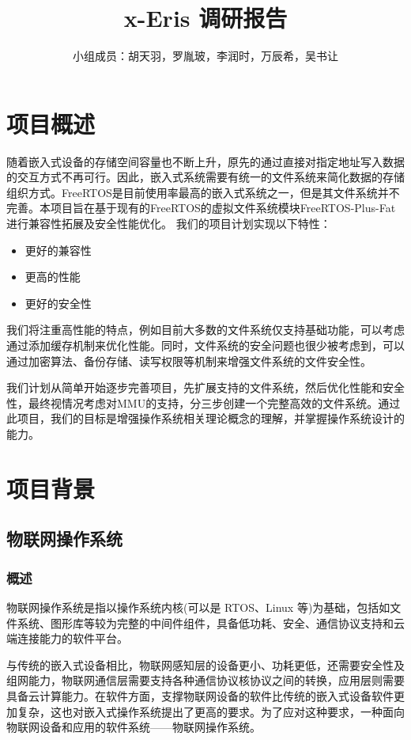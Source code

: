\documentclass[UTF8,a4paper]{ctexart}
\title{\textbf{x-Eris 调研报告}}
\author{小组成员：胡天羽，罗胤玻，李润时，万辰希，吴书让}
\begin{document}
\maketitle

\newpage
\tableofcontents
\newpage

\section{项目概述}
随着嵌入式设备的存储空间容量也不断上升，原先的通过直接对指定地址写入数据的交互方式不再可行。因此，嵌入式系统需要有统一的文件系统来简化数据的存储组织方式。FreeRTOS是目前使用率最高的嵌入式系统之一，但是其文件系统并不完善。本项目旨在基于现有的FreeRTOS的虚拟文件系统模块FreeRTOS-Plus-Fat进行兼容性拓展及安全性能优化。
我们的项目计划实现以下特性：
\begin{itemize}
    \item 更好的兼容性
    \item 更高的性能
    \item 更好的安全性
\end{itemize}

我们将注重高性能的特点，例如目前大多数的文件系统仅支持基础功能，可以考虑通过添加缓存机制来优化性能。同时，文件系统的安全问题也很少被考虑到，可以通过加密算法、备份存储、读写权限等机制来增强文件系统的文件安全性。

我们计划从简单开始逐步完善项目，先扩展支持的文件系统，然后优化性能和安全性，最终视情况考虑对MMU的支持，分三步创建一个完整高效的文件系统。通过此项目，我们的目标是增强操作系统相关理论概念的理解，并掌握操作系统设计的能力。

\section{项目背景}
\subsection{物联网操作系统}
\subsubsection{概述}
物联网操作系统是指以操作系统内核(可以是 RTOS、Linux 等)为基础，包括如文件系统、图形库等较为完整的中间件组件，具备低功耗、安全、通信协议支持和云端连接能力的软件平台。

与传统的嵌入式设备相比，物联网感知层的设备更小、功耗更低，还需要安全性及组网能力，物联网通信层需要支持各种通信协议核协议之间的转换，应用层则需要具备云计算能力。在软件方面，支撑物联网设备的软件比传统的嵌入式设备软件更加复杂，这也对嵌入式操作系统提出了更高的要求。为了应对这种要求，一种面向物联网设备和应用的软件系统——物联网操作系统。
\end{document}
